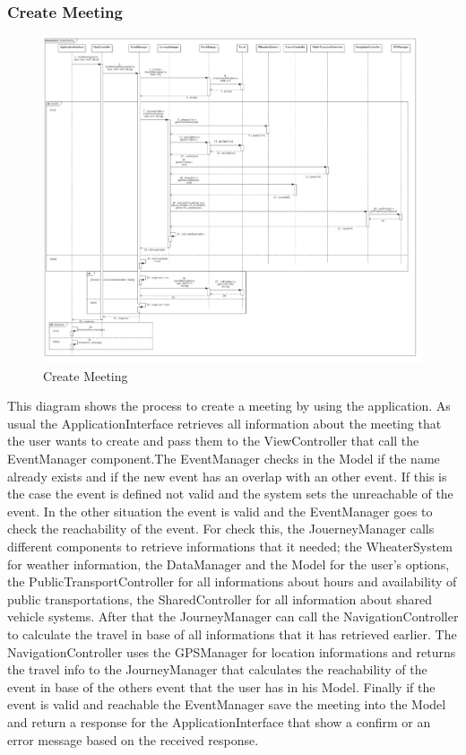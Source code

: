 \subsubsection{Create Meeting}
\begin{figure}[!h]
\centering
\includegraphics[scale=0.25]{images/CreateMeeting}
\caption{Create Meeting}
\end{figure}
\par\bigskip 
\noindent
This diagram shows the process to create a meeting by using the application. As usual the ApplicationInterface retrieves all information about the meeting that the user wants to create and pass them to the ViewController that call the EventManager component.The EventManager checks in the Model if the name already exists and if the new event has an overlap with an other event. If this is the case the event is defined not valid and the system sets the unreachable of the event. In the other situation the event is valid and the EventManager goes to check the reachability of the event. For check this, the JouerneyManager calls different components to retrieve informations that it needed; the WheaterSystem for weather information, the DataManager and the Model for the user’s options, the PublicTransportController for all informations about hours and availability of public transportations, the SharedController for all information about shared vehicle systems. After that the JourneyManager can call the NavigationController to calculate the travel in base of all informations that it has retrieved earlier. The NavigationController uses the GPSManager for location informations and returns the travel info to the JourneyManager that calculates the reachability of the event in base of the others event that the user has in his Model. Finally if the event is valid and reachable the EventManager save the meeting into the Model and return a response for the ApplicationInterface that show a confirm or an error message based on the received response.


